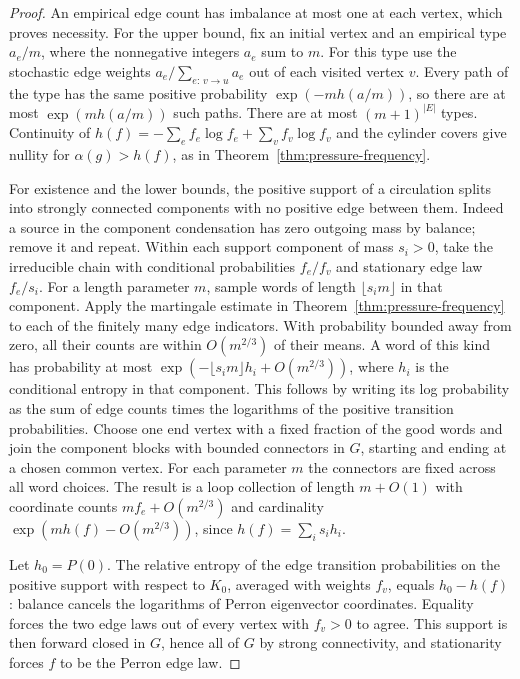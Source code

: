 \documentclass[11pt]{article}
\theoremstyle{definition}
\theoremstyle{remark}
\begin{document}
\begin{proof}
An empirical edge count has imbalance at most one at each vertex,
which proves necessity. For the upper bound, fix an initial vertex
and an empirical type $a_e/m$, where the nonnegative integers $a_e$
sum to $m$. For this type use the stochastic edge weights
$a_e/\sum_{e:\,v\to u}a_e$ out of each visited vertex $v$.
Every path of the type has the same positive probability
$\exp(-m h(a/m))$, so there are at most $\exp(m h(a/m))$ such paths.
There are at most $(m+1)^{|E|}$ types. Continuity of
$h(f)=-\sum_e f_e\log f_e+\sum_v f_v\log f_v$ and the cylinder
covers give nullity for $\alpha(g)>h(f)$, as in
Theorem~\ref{thm:pressure-frequency}.

For existence and the lower bounds, the positive support of a
circulation splits into strongly connected components with no
positive edge between them. Indeed a source in the component
condensation has zero outgoing mass by balance; remove it and
repeat. Within each support component of mass $s_i>0$, take the
irreducible chain with conditional probabilities $f_e/f_v$ and
stationary edge law $f_e/s_i$. For a length parameter $m$, sample
words of length $\lfloor s_i m\rfloor$ in that component.
Apply the martingale estimate in Theorem~\ref{thm:pressure-frequency}
to each of the finitely many edge indicators. With probability
bounded away from zero, all their counts are within $O(m^{2/3})$
of their means. A word of this kind has probability at most
$\exp(-\lfloor s_i m\rfloor h_i+O(m^{2/3}))$, where $h_i$
is the conditional entropy in that component. This follows by
writing its log probability as the sum of edge counts times
the logarithms of the positive transition probabilities.
Choose one end vertex with a fixed fraction of the good words
and join the component blocks with bounded connectors in $G$,
starting and ending at a chosen common vertex. For each parameter
$m$ the connectors are fixed across all word choices. The
result is a loop collection of length $m+O(1)$ with coordinate
counts $mf_e+O(m^{2/3})$ and cardinality
$\exp(mh(f)-O(m^{2/3}))$, since $h(f)=\sum_i s_i h_i$.

Let $h_0=P(0)$. The relative entropy of the edge transition
probabilities on the positive support with respect to $K_0$,
averaged with weights $f_v$, equals $h_0-h(f)$: balance cancels
the logarithms of Perron eigenvector coordinates. Equality
forces the two edge laws out of every vertex with $f_v>0$ to
agree. This support is then forward closed in $G$, hence all
of $G$ by strong connectivity, and stationarity forces
$f$ to be the Perron edge law.


\end{proof}
\end{document}
